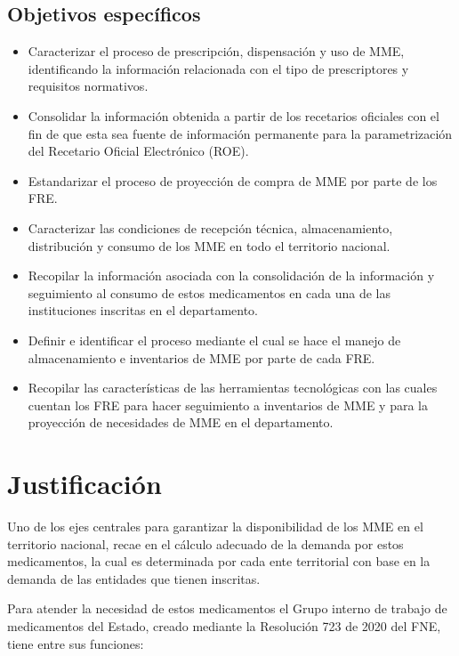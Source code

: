 \documentclass[
  oneside]{book}
\begin{document}
\hypertarget{objetivos-especuxedficos}{%
\section{Objetivos específicos}\label{objetivos-especuxedficos}}

\begin{itemize}
\item
  Caracterizar el proceso de prescripción, dispensación y uso de MME, identificando la información relacionada con el tipo de prescriptores y requisitos normativos.
\item
  Consolidar la información obtenida a partir de los recetarios oficiales con el fin de que esta sea fuente de información permanente para la parametrización del Recetario Oficial Electrónico (ROE).
\item
  Estandarizar el proceso de proyección de compra de MME por parte de los FRE.
\item
  Caracterizar las condiciones de recepción técnica, almacenamiento, distribución y consumo de los MME en todo el territorio nacional.
\item
  Recopilar la información asociada con la consolidación de la información y seguimiento al consumo de estos medicamentos en cada una de las instituciones inscritas en el departamento.
\item
  Definir e identificar el proceso mediante el cual se hace el manejo de almacenamiento e inventarios de MME por parte de cada FRE.
\item
  Recopilar las características de las herramientas tecnológicas con las cuales cuentan los FRE para hacer seguimiento a inventarios de MME y para la proyección de necesidades de MME en el departamento.
\end{itemize}

\hypertarget{justificaciuxf3n}{%
\chapter{Justificación}\label{justificaciuxf3n}}

Uno de los ejes centrales para garantizar la disponibilidad de los MME en el territorio nacional, recae en el cálculo adecuado de la demanda por estos medicamentos, la cual es determinada por cada ente territorial con base en la demanda de las entidades que tienen inscritas.

Para atender la necesidad de estos medicamentos el Grupo interno de trabajo de medicamentos del Estado, creado mediante la Resolución 723 de 2020 del FNE, tiene entre sus funciones:
\end{document}
